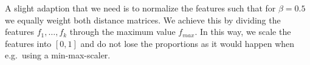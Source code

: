 A slight adaption that we need is to normalize the features such that for $\beta = 0.5$ we equally weight both distance matrices. We achieve this by dividing the features $f_1, \dots, f_k$ through the maximum value $f_{max}$. In this way, we scale the features into $[0,1]$ and do not lose the proportions as it would happen when e.g.\ using a min-max-scaler.